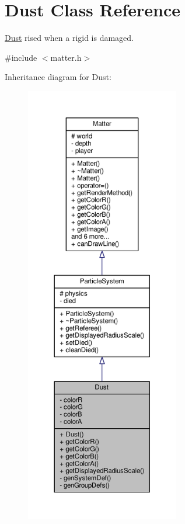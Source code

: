 \hypertarget{classDust}{}\section{Dust Class Reference}
\label{classDust}


\hyperlink{classDust}{Dust} rised when a rigid is damaged.  




{\ttfamily \#include $<$matter.\+h$>$}



Inheritance diagram for Dust\+:
\nopagebreak
\begin{figure}[H]
\begin{center}
\leavevmode
\includegraphics[height=550pt]{classDust__inherit__graph}
\end{center}
\end{figure}


